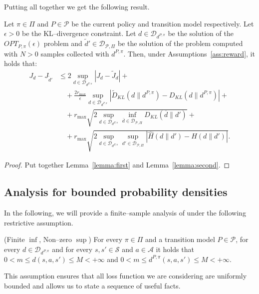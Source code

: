 Putting all together we get the following result.

\begin{theorem}
\label{thr:decomposition}
Let $\pi \in \Pi$ and $P \in \mathcal{P}$ be the current policy and transition model respectively. Let $\epsilon > 0$ be the KL--divergence constraint. Let $d \in \mathcal{D}_{d^{P,\pi}}$ be the solution of the $OPT_{P,\pi}(\epsilon)$ problem and $\widetilde{d}' \in \mathcal{D}_{\mathcal{P}, \Pi}$ be the solution of the \rempskappahat{\epsilon} problem computed with $N>0$ samples collected with $d^{P,\pi}$. Then, under Assumptions~\ref{ass:reward}, it holds that:
\begin{align*}
	 J_{d} - J_{\widetilde{d}'} & \le 2 \sup_{d \in \mathcal{D}_{d^{P,\pi}}} | J_d - \widetilde{J}_d | + \\ & \quad + \frac{2 r_{\max}}{\epsilon} \sup_{d \in \mathcal{D}_{d^{P,\pi}}} \left| {\widetilde{D}}_{KL}(d \|d^{P,\pi})- D_{KL}(d \|d^{P,\pi})\right| + \\
	 & \quad + r_{\max} \sqrt{2 \sup_{d \in \mathcal{D}_{d^{P,\pi}}}  \inf_{\overline{d} \in \mathcal{D}_{\mathcal{P}, \Pi}} D_{KL}( \overline{d} \| d')} +  \\
	 & \quad + r_{\max} \sqrt{2 \sup_{d \in \mathcal{D}_{d^{P,\pi}}} \sup_{d' \in \mathcal{D}_{\mathcal{P}, \Pi}} \left| \widehat{H} (d \| d') -  H(d \| d') \right|}.
\end{align*}
\end{theorem}

\begin{proof}
	Put together Lemma~\ref{lemma:first} and Lemma~\ref{lemma:second}.
\end{proof}

\subsection{Analysis for bounded probability densities}
In the following, we will provide a finite--sample analysis of \remps under the following restrictive assumption.
\begin{ass}
\label{ass:finite}
	(Finite $\inf$, Non--zero $\sup$) For every $\pi \in \Pi$ and a transition model $P \in \mathcal{P}$, for every $d \in \mathcal{D}_{d^{P,\pi}}$ and for every $s,s' \in \mathcal{S}$ and $a \in \mathcal{A}$ it holds that $0 < m \le d(s,a,s') \le M < +\infty$ and  $0 < m \le d^{P,\pi}(s,a,s') \le M < +\infty$.
\end{ass}

This assumption ensures that all loss function we are considering are uniformly bounded and allows us to state a sequence of useful facts.

